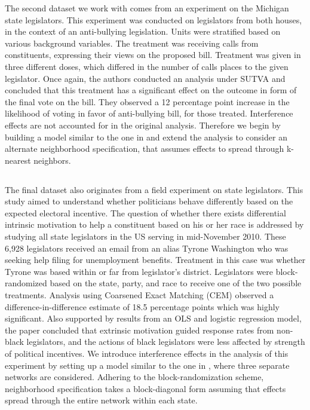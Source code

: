 \documentclass[12pt]{article}
\begin{document}
The second dataset we work with comes from an experiment on the Michigan state legislators. This experiment was conducted on legislators from both houses, in the context of an anti-bullying legislation. Units were stratified based on various background variables. The treatment was receiving calls from constituents, expressing their views on the proposed bill. Treatment was given in three different doses, which differed in the number of calls places to the given legislator. Once again, the authors conducted an analysis under SUTVA and concluded that this treatment has a significant effect on the outcome in form of the final vote on the bill. They observed a 12 percentage point increase in the likelihood of voting in favor of anti-bullying bill, for those treated. Interference effects are not accounted for in the original analysis. Therefore we begin by building a model similar to the one in \citet{coppock2014information} and extend the analysis to consider an alternate neighborhood specification, that assumes effects to spread through k-nearest neighbors.


\subsection{\citet{broockman2013black}}

The final dataset also originates from a field experiment on state legislators. This study aimed to understand whether politicians behave differently based on the expected electoral incentive. The question of whether there exists differential intrinsic motivation to help a constituent based on his or her race is addressed by studying all state legislators in the US serving in mid-November 2010. These 6,928 legislators received an email from an alias Tyrone Washington who was seeking help filing for unemployment benefits. Treatment in this case was whether Tyrone was based within or far from legislator's district. Legislators were block-randomized based on the state, party, and race to receive one of the two possible treatments. Analysis using Coarsened Exact Matching (CEM) observed a difference-in-difference estimate of 18.5 percentage points which was highly significant. Also supported by results from an OLS and logistic regression model, the paper concluded that extrinsic motivation guided response rates from non-black legislators, and the actions of black legislators were less affected by strength of political incentives. We introduce interference effects in the analysis of this experiment by setting up a model similar to the one in \citet{coppock2014information}, where three separate networks are considered. Adhering to the block-randomization scheme, neighborhood specification takes a block-diagonal form assuming that effects spread through the entire network within each state.
\end{document}
